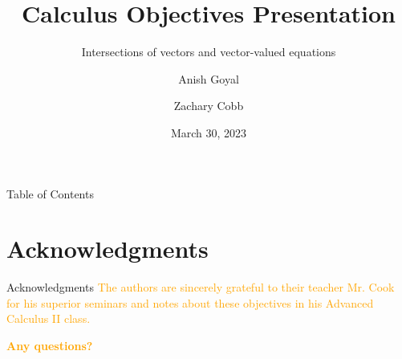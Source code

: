 \documentclass[14pt, aspectratio=43]{beamer}
\title{Calculus Objectives Presentation}
\subtitle{Intersections of vectors and vector-valued equations}
\author[Anish \& Zachary]{Anish Goyal \and Zachary Cobb}
\institute[GSMST]{
    Gwinnett School of Math,%
    \\%
     Science, and Technology%
} %
\date{March 30, 2023}
\begin{document}
    
    \frame{\titlepage}
    
    \begin{frame}{Table of Contents}
        \begin{multicols}{2}
        \tableofcontents
        \end{multicols}
    \end{frame}

    
    

    \section{Acknowledgments}
    \frame{\sectionpage}
        \begin{frame}{Acknowledgments}
            \textcolor{orange}{The authors are sincerely grateful to their teacher Mr. Cook for his superior seminars and notes about these objectives in his Advanced Calculus II class.}
        \end{frame}

    \begin{frame}{}
        \centering
            \Huge\bfseries
        \textcolor{orange}{Any questions?}
    \end{frame}
\end{document}
